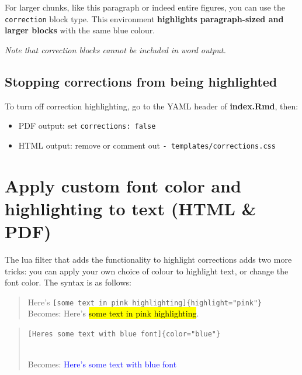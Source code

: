 \documentclass[a4paper, twoside]{templates/ociamthesis}
\providecommand{\tightlist}{%
  \setlength{\itemsep}{0pt}\setlength{\parskip}{0pt}}
\begin{document}
\begin{correction}
For larger chunks, like this paragraph or indeed entire figures, you can
use the \texttt{correction} block type. This environment
\textbf{highlights paragraph-sized and larger blocks} with the same blue
colour.
\end{correction}

\emph{Note that correction blocks cannot be included in word output.}

\hypertarget{stopping-corrections-from-being-highlighted}{%
\subsection{Stopping corrections from being highlighted}\label{stopping-corrections-from-being-highlighted}}

To turn off correction highlighting, go to the YAML header of \textbf{index.Rmd}, then:

\begin{itemize}
\tightlist
\item
  PDF output: set \texttt{corrections:\ false}\\
\item
  HTML output: remove or comment out \texttt{-\ templates/corrections.css}
\end{itemize}

\hypertarget{apply-custom-font-color-and-highlighting-to-text-html-pdf}{%
\section{Apply custom font color and highlighting to text (HTML \& PDF)}\label{apply-custom-font-color-and-highlighting-to-text-html-pdf}}

The lua filter that adds the functionality to highlight corrections adds two more tricks:
you can apply your own choice of colour to highlight text, or change the font color.
The syntax is as follows:

\begin{quote}
Here's \texttt{{[}some\ text\ in\ pink\ highlighting{]}\{highlight="pink"\}}\\
Becomes: Here's \hl{some text in pink highlighting}.
\end{quote}

\begin{quote}
\texttt{{[}Here\textquotesingle{}s\ some\ text\ with\ blue\ font{]}\{color="blue"\}}\strut \\
Becomes: \textcolor{blue}{Here's some text with blue font}
\end{quote}
\end{document}

